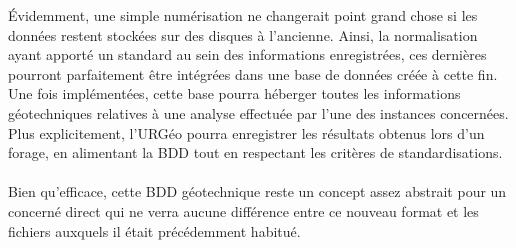 \par
Évidemment, une simple numérisation ne changerait point grand chose 
si les données restent stockées sur des disques à l'ancienne. Ainsi, 
la normalisation ayant apporté un standard au sein des informations 
enregistrées, ces dernières pourront parfaitement être intégrées dans 
une base de données créée à cette fin. Une fois implémentées, cette 
base pourra héberger toutes les informations géotechniques relatives 
à une analyse effectuée par l'une des instances concernées. Plus 
explicitement, l'URGéo pourra enregistrer les résultats obtenus lors 
d'un forage, en alimentant la BDD tout en respectant les critères de 
standardisations.
\paragraph{}
Bien qu'efficace, cette BDD géotechnique reste un concept assez 
abstrait pour un concerné direct qui ne verra aucune différence 
entre ce nouveau format et les fichiers auxquels il était 
précédemment habitué.